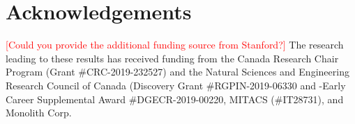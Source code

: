 \section{Acknowledgements}
\textcolor{red}{[Could you provide the additional funding source from Stanford?]}
The research leading to these results has received funding from the Canada Research Chair Program (Grant \#CRC-2019-232527) and the Natural Sciences and Engineering Research Council of Canada (Discovery Grant \#RGPIN-2019-06330 and -Early Career Supplemental Award \#DGECR-2019-00220, MITACS (\#IT28731), and Monolith Corp.